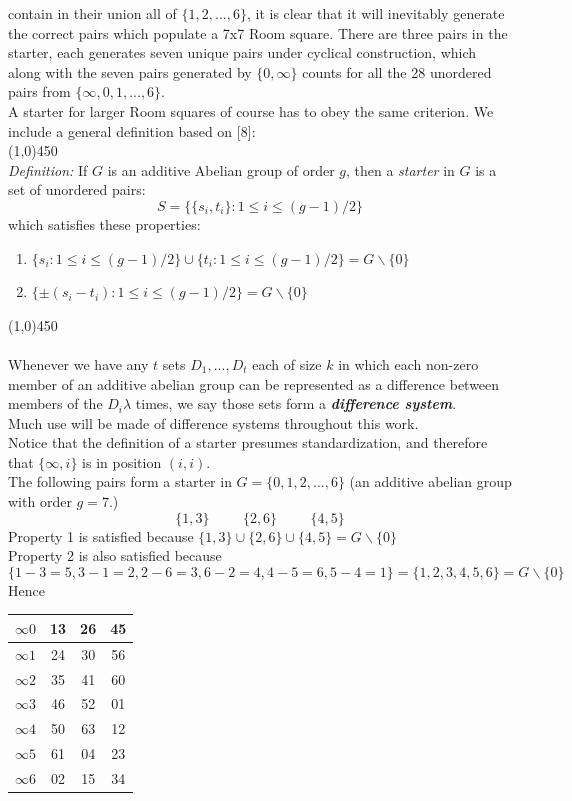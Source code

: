 \documentclass[
  12pt,
  a4paper]{book}
\begin{document}
contain in their union all of \(\{1,2,...,6\}\), it is clear that it
will inevitably generate the correct pairs which populate a 7x7 Room
square. There are three pairs in the starter, each generates seven
unique pairs under cyclical construction, which along with the seven
pairs generated by \(\{0,\infty\}\) counts for all the 28 unordered
pairs from \(\{\infty,0,1,...,6\}\).\\
A starter for larger Room squares of course has to obey the same
criterion. We include a general definition based on {[}8{]}:\\
(1,0){450}\\
\emph{Definition:} If \(G\) is an additive Abelian group of order \(g\),
then a \emph{starter} in \(G\) is a set of unordered pairs:
\[S=\{\{s_i,t_i\}:1 \leq i \leq (g-1)/2\}\] which satisfies these
properties:

\begin{enumerate}
\def\labelenumi{\arabic{enumi}.}
\item
  \(\{s_i:1 \leq i \leq (g-1)/2\} \cup \{t_i : 1 \leq i \leq (g-1)/2\} = G \backslash \{0\}\)
\item
  \(\{\pm (s_i - t_i ) : 1 \leq i \leq (g-1)/2 \} = G \backslash \{0\}\)
\end{enumerate}

(1,0){450}\\
~\\
Whenever we have any \(t\) sets \(D_1,...,D_t\) each of size \(k\) in
which each non-zero member of an additive abelian group can be
represented as a difference between members of the \(D_i \lambda\)
times, we say those sets form a \textbf{\emph{difference system}}.\\
Much use will be made of difference systems throughout this work.\\
Notice that the definition of a starter presumes standardization, and
therefore that \(\{\infty,i\}\) is in position \((i,i)\).\\
The following pairs form a starter in \(G=\{0,1,2,...,6\}\) (an additive
abelian group with order \(g=7\).)
\[\{1,3\} \hspace{1cm} \{2,6\} \hspace{1cm} \{4,5\}\] Property 1 is
satisfied because
\(\{1,3\} \cup \{2,6\} \cup \{4,5\} = G \backslash \{0\}\)\\
Property 2 is also satisfied because
\[\{1-3=5,3-1=2,2-6=3,6-2=4,4-5=6,5-4=1\}=\{1,2,3,4,5,6\}=G\backslash \{0\}\]
Hence

\begin{longtable}[]{@{}cccc@{}}
\toprule
\(\infty 0\) & 13 & 26 & 45\tabularnewline
\midrule
\endhead
\(\infty 1\) & 24 & 30 & 56\tabularnewline
\(\infty 2\) & 35 & 41 & 60\tabularnewline
\(\infty 3\) & 46 & 52 & 01\tabularnewline
\(\infty 4\) & 50 & 63 & 12\tabularnewline
\(\infty 5\) & 61 & 04 & 23\tabularnewline
\(\infty 6\) & 02 & 15 & 34\tabularnewline
\bottomrule
\end{longtable}
\end{document}
